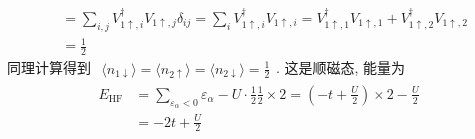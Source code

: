 \documentclass[../../main.tex]{subfiles}
\begin{document}
\begin{enumerate}
\begin{align*}
    &= \sum_{i,j}V_{1\uparrow, i}^{\dagger}V_{1\uparrow,j}\delta_{ij} 
     = \sum_{i}V_{1\uparrow, i}^{\dagger}V_{1\uparrow,i} 
     = V_{1\uparrow,1}^{\dagger}V_{1\uparrow,1} + V_{1\uparrow,2}^{\dagger}V_{1\uparrow,2} \\
    &= \frac{1}{2}
  \end{align*}
  同理计算得到 $\begin{aligned}
    \langle n_{1\downarrow}\rangle = \langle n_{2\uparrow}\rangle = \langle n_{2\downarrow}\rangle = \frac{1}{2}
  \end{aligned}$. 这是顺磁态, 能量为 
  \begin{align*}
    E_{\text{HF}} &= \sum_{\varepsilon_{\alpha}<0}\varepsilon_{\alpha}
    - U\cdot \frac{1}{2}\frac{1}{2}\times 2 = \left(-t + \frac{U}{2}\right)\times 2 - \frac{U}{2}\\
    &= -2t + \frac{U}{2}
  \end{align*}


\end{enumerate}
\end{document}
